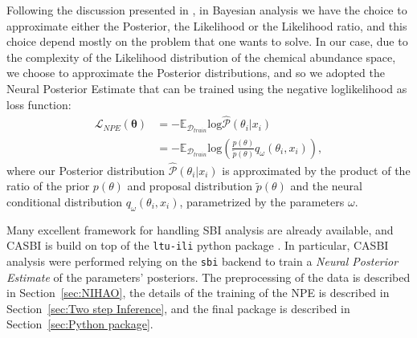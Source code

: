 Following the discussion presented in \cite{hoLtUILIAllinOneFramework2024}, in Bayesian analysis we have the choice to approximate either the Posterior, the Likelihood or the Likelihood ratio, and this choice depend mostly on the problem that one wants to solve. In our case, due to the complexity of the Likelihood distribution of the chemical abundance space, we choose to approximate the Posterior distributions, and so we adopted the Neural Posterior Estimate that can be trained using the negative loglikelihood as loss function:
\begin{equation}
\begin{aligned}
    \mathcal{L}_{NPE}(\boldsymbol{\theta}) &= - \mathbb{E}_{\mathcal{D}_{train}} \text{log} \hat{\mathcal{P}}(\theta_i | x_i) \\ 
    &= - \mathbb{E}_{\mathcal{D}_{train}} \text{log} \left( \frac{p(\theta)}{\tilde{p}(\theta)} q_{\omega}(\theta_i, x_i) \right), 
\end{aligned}
\end{equation}
where our Posterior distribution $ \hat{\mathcal{P}}(\theta_i | x_i)$ is approximated by the product of the ratio of the prior $p(\theta)$ and proposal distribution $\tilde{p}(\theta)$ and the neural conditional distribution $q_{\omega}(\theta_i, x_i)$, parametrized by the parameters $\omega$. 

Many excellent framework for handling SBI analysis are already available, and CASBI is build on top of the \texttt{ltu-ili} python package \cite{hoLtUILIAllinOneFramework2024}. In particular, CASBI analysis were performed relying on the \texttt{sbi} backend \cite{tejero-canteroSbiToolkitSimulationbased2020} to train a \textit{Neural Posterior Estimate} of the parameters' posteriors. The preprocessing of the data is described in Section~\ref{sec:NIHAO}, the details of the training of the NPE is described in Section~\ref{sec:Two step Inference}, and the final package is described in Section~\ref{sec:Python package}.


